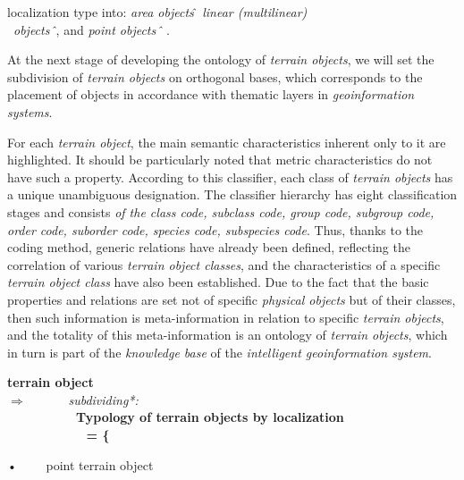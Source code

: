\documentclass{article}
\begin{document}
\begin{multicols}{2}

\begin{tabbing}
	\hspace{-0.17cm} localization type into:\textit{ area objects\^\,\ linear (multilinear)}\\ \ \textit{objects\^\ }, and \textit{point objects\^\ } .
\end{tabbing}
          At the next stage of developing the ontology of
\textit{terrain objects}, we will set the subdivision of \textit{terrain
objects} on orthogonal bases, which corresponds to the
placement of objects in accordance with thematic layers
in \textit{geoinformation systems}.

      For each \textit{terrain object}, the main semantic characteristics inherent only 
to it are highlighted. It should be
particularly noted that metric characteristics do not have
such a property. According to this classifier, each class
of \textit{terrain objects} has a unique unambiguous designation.
The classifier hierarchy has eight classification stages and
consists \textit{of the class code, subclass code, group code,
subgroup code, order code, suborder code, species code,
subspecies code}. Thus, thanks to the coding method,
generic relations have already been defined, reflecting
the correlation of various \textit{terrain object classes}, and the
characteristics of a specific \textit{terrain object class} have also
been established. Due to the fact that the basic properties
and relations are set not of specific \textit{physical objects} but of
their classes, then such information is meta-information in
relation to specific \textit{terrain objects}, and the totality of this
meta-information is an ontology of \textit{terrain objects}, which
in turn is part of the \textit{knowledge base} of the \textit{intelligent
geoinformation system}.
\begin{tabbing}
\hspace{0cm}\textbf{terrain object}\\
 \(\Rightarrow\) \ \ \ \ \ \   \textit{subdividing*:}\\
 \ \ \ \ \ \ \ \ \ \ \ \textbf{Typology of terrain objects by localization\^\\ \ \ \ \ \ \ \ \ \ \ \  =  \{ }
\end{tabbing}
\begin{adjustwidth}{15mm}{}
 \begin{itemize}  
 •  \ \ \ \     point terrain object
    \begin{itemize}

\end{itemize}
\end{itemize}
\end{adjustwidth}
\end{multicols}
\end{document}
